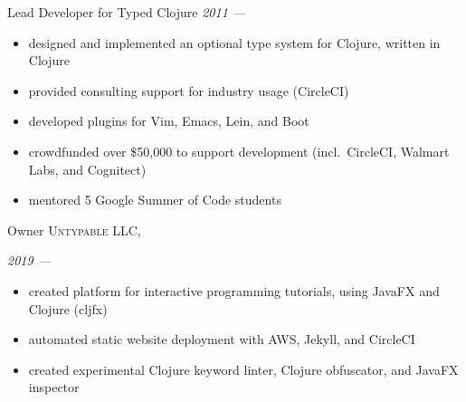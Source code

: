 \documentclass[10pt,a4paper]{article}
\begin{document}




\headedsection
  {Lead Developer for Typed Clojure}
  {\textit{2011 ---}}
  {
  \begin{itemize}
    \item designed and implemented an optional type system for Clojure, written in Clojure
    \item provided consulting support for industry usage (CircleCI)
    \item developed plugins for Vim, Emacs, Lein, and Boot
    \item crowdfunded over \$50,000 to support development (incl.~CircleCI, Walmart Labs, 
      and Cognitect)
    \item mentored 5 Google Summer of Code students
  \end{itemize}
  }

\headedsection
  {Owner}
  {\textsc{Untypable LLC, }}
  {%
      {\textit{2019 ---}}
      {%
      \begin{itemize}
        \item created platform for interactive programming tutorials, using JavaFX and Clojure (cljfx)
        \item automated static website deployment with AWS, Jekyll, and CircleCI
        \item created experimental Clojure keyword linter, Clojure obfuscator, and JavaFX inspector
      \end{itemize}
      }%
  }
\end{document}
